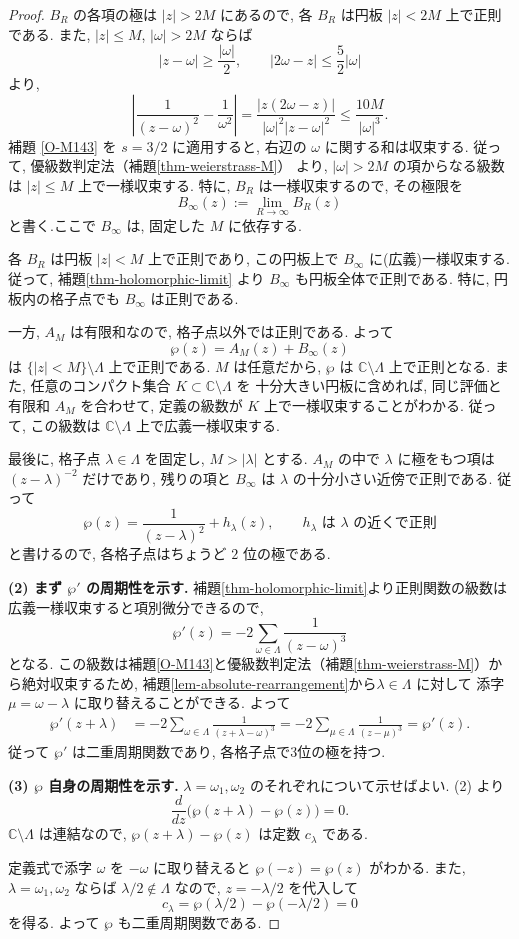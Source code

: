 \documentclass[dvipdfmx,a4paper,11pt]{article} %
\newcommand{\C}{\mathbb{C}}
\theoremstyle{definition}
\numberwithin{equation}{section}
\begin{document}
\begin{proof}
$B_R$ の各項の極は $|z|>2M$ にあるので, 
各 $B_R$ は円板 $|z|<2M$ 上で正則である.
また, $|z|\leq M$, $|\omega|>2M$ ならば
\[
|z-\omega|\geq\frac{|\omega|}{2},
\qquad |2\omega-z|\leq\frac52|\omega|
\]
より, 
\[
\left|
\frac1{(z-\omega)^2}-\frac1{\omega^2}
\right|
=
\frac{|z(2\omega-z)|}{|\omega|^2|z-\omega|^2}
\leq\frac{10M}{|\omega|^3}.
\]
補題 \ref{O-M143} を $s=3/2$ に適用すると, 
右辺の $\omega$ に関する和は収束する.
従って, 優級数判定法（補題\ref{thm-weierstrass-M}） より, 
$|\omega|>2M$ の項からなる級数は
$|z|\leq M$ 上で一様収束する.
特に, $B_R$ は一様収束するので, その極限を
\[
B_\infty(z):=\lim_{R\to\infty}B_R(z)
\]
と書く.ここで $B_\infty$ は, 固定した $M$ に依存する.

各 $B_R$ は円板 $|z|<M$ 上で正則であり, 
この円板上で $B_\infty$ に(広義)一様収束する.
従って, 補題\ref{thm-holomorphic-limit} より $B_\infty$ も円板全体で正則である.
特に, 円板内の格子点でも $B_\infty$ は正則である.

一方, $A_M$ は有限和なので, 格子点以外では正則である.
よって
\[
\wp(z)=A_M(z)+B_\infty(z)
\]
は $\{|z|<M\}\setminus\Lambda$ 上で正則である.
$M$ は任意だから, $\wp$ は $\C\setminus\Lambda$ 上で正則となる.
また, 任意のコンパクト集合 $K\subset\C\setminus\Lambda$ を
十分大きい円板に含めれば, 同じ評価と有限和 $A_M$ を合わせて, 
定義の級数が $K$ 上で一様収束することがわかる.
従って, この級数は $\C\setminus\Lambda$ 上で広義一様収束する.

最後に, 格子点 $\lambda\in\Lambda$ を固定し, 
$M>|\lambda|$ とする.
$A_M$ の中で $\lambda$ に極をもつ項は
$(z-\lambda)^{-2}$ だけであり, 
残りの項と $B_\infty$ は $\lambda$ の十分小さい近傍で正則である.
従って
\[
\wp(z)=\frac1{(z-\lambda)^2}+h_\lambda(z),
\qquad
h_\lambda\text{ は }\lambda\text{ の近くで正則}
\]
と書けるので, 各格子点はちょうど $2$ 位の極である.




\medskip
\textbf{(2) まず $\wp'$ の周期性を示す.}
補題\ref{thm-holomorphic-limit}より正則関数の級数は広義一様収束すると項別微分できるので, 
\[
\wp'(z)=-2\sum_{\omega\in\Lambda}\frac{1}{(z-\omega)^3}
\]
となる.
この級数は補題\ref{O-M143}と優級数判定法（補題\ref{thm-weierstrass-M}）から絶対収束するため, 補題\ref{lem-absolute-rearrangement}から$\lambda\in\Lambda$ に対して
添字 $\mu=\omega-\lambda$ に取り替えることができる. 
よって
\[
\begin{aligned}
\wp'(z+\lambda)
&=-2\sum_{\omega\in\Lambda}
\frac{1}{(z+\lambda-\omega)^3}
=-2\sum_{\mu\in\Lambda}\frac{1}{(z-\mu)^3}
=\wp'(z).
\end{aligned}
\]
従って $\wp'$ は二重周期関数であり, 各格子点で3位の極を持つ. 

\medskip
\textbf{(3) $\wp$ 自身の周期性を示す.}
$\lambda=\omega_1,\omega_2$ のそれぞれについて示せばよい.
(2) より
\[
\frac{d}{dz}\bigl(\wp(z+\lambda)-\wp(z)\bigr)=0.
\]
$\C\setminus\Lambda$ は連結なので, 
$\wp(z+\lambda)-\wp(z)$ は定数 $c_\lambda$ である.

定義式で添字 $\omega$ を $-\omega$ に取り替えると
$\wp(-z)=\wp(z)$ がわかる.
また, $\lambda=\omega_1,\omega_2$ ならば $\lambda/2\notin\Lambda$ なので, 
$z=-\lambda/2$ を代入して
\[
c_\lambda=\wp(\lambda/2)-\wp(-\lambda/2)=0
\]
を得る.
よって $\wp$ も二重周期関数である. 
\end{proof}
\end{document}
